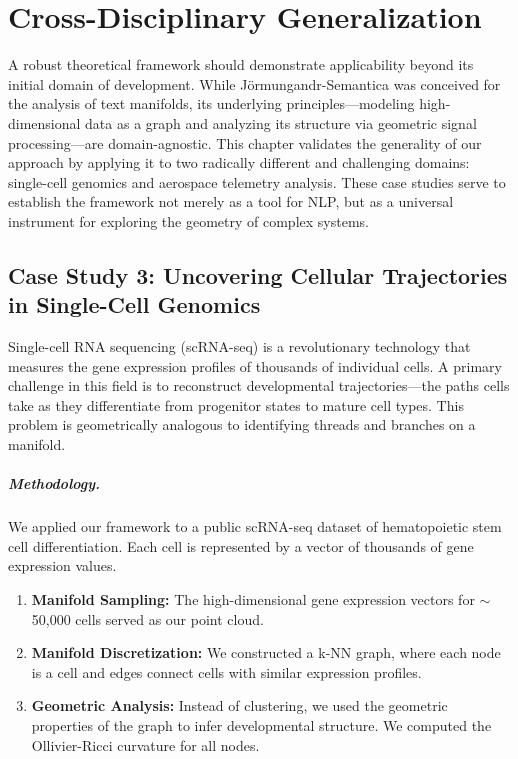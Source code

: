 \chapter{Cross-Disciplinary Generalization}
\label{chap:generalization}

A robust theoretical framework should demonstrate applicability beyond its initial domain of development. While Jörmungandr-Semantica was conceived for the analysis of text manifolds, its underlying principles—modeling high-dimensional data as a graph and analyzing its structure via geometric signal processing—are domain-agnostic. This chapter validates the generality of our approach by applying it to two radically different and challenging domains: single-cell genomics and aerospace telemetry analysis. These case studies serve to establish the framework not merely as a tool for NLP, but as a universal instrument for exploring the geometry of complex systems.

\section{Case Study 3: Uncovering Cellular Trajectories in Single-Cell Genomics}
\label{sec:genomics}
Single-cell RNA sequencing (scRNA-seq) is a revolutionary technology that measures the gene expression profiles of thousands of individual cells. A primary challenge in this field is to reconstruct developmental trajectories—the paths cells take as they differentiate from progenitor states to mature cell types. This problem is geometrically analogous to identifying threads and branches on a manifold.

\paragraph{Methodology.} We applied our framework to a public scRNA-seq dataset of hematopoietic stem cell differentiation. Each cell is represented by a vector of thousands of gene expression values.
\begin{enumerate}
    \item \textbf{Manifold Sampling:} The high-dimensional gene expression vectors for $\sim$50,000 cells served as our point cloud.
    \item \textbf{Manifold Discretization:} We constructed a k-NN graph, where each node is a cell and edges connect cells with similar expression profiles.
    \item \textbf{Geometric Analysis:} Instead of clustering, we used the geometric properties of the graph to infer developmental structure. We computed the Ollivier-Ricci curvature for all nodes.
\end{enumerate}


